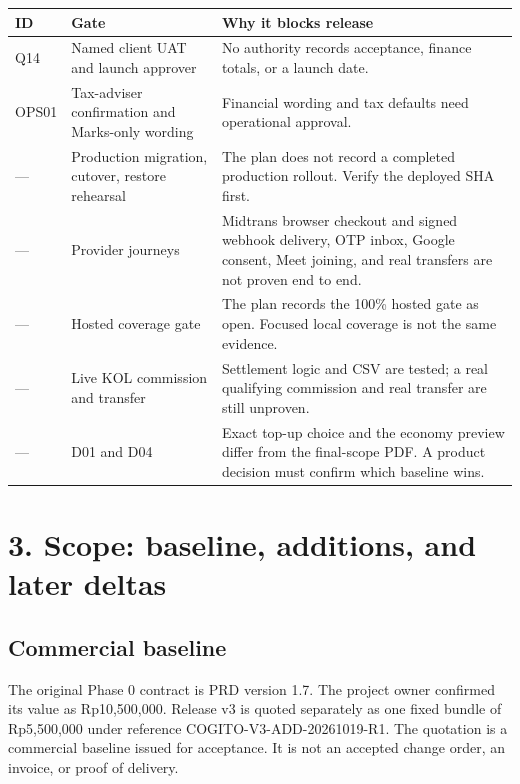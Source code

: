 \documentclass[11pt,a4paper]{article}
\begin{document}
\begin{tabular}{@{}L{1.3cm}L{5.3cm}L{8.3cm}@{}}
\toprule
\textbf{ID} & \textbf{Gate} & \textbf{Why it blocks release} \\
\midrule
Q14 & Named client UAT and launch approver & No authority records acceptance, finance totals, or a launch date. \\
OPS01 & Tax-adviser confirmation and Marks-only wording & Financial wording and tax defaults need operational approval. \\
--- & Production migration, cutover, restore rehearsal & The plan does not record a completed production rollout. Verify the deployed SHA first. \\
--- & Provider journeys & Midtrans browser checkout and signed webhook delivery, OTP inbox, Google consent, Meet joining, and real transfers are not proven end to end. \\
--- & Hosted coverage gate & The plan records the 100\% hosted gate as open. Focused local coverage is not the same evidence. \\
--- & Live KOL commission and transfer & Settlement logic and CSV are tested; a real qualifying commission and real transfer are still unproven. \\
--- & D01 and D04 & Exact top-up choice and the economy preview differ from the final-scope PDF. A product decision must confirm which baseline wins. \\
\bottomrule
\end{tabular}

\section{3. Scope: baseline, additions, and later deltas}

\subsection{Commercial baseline}

The original Phase 0 contract is PRD version 1.7. The project owner confirmed its value as Rp10,500,000. Release v3 is quoted separately as one fixed bundle of Rp5,500,000 under reference COGITO-V3-ADD-20261019-R1. The quotation is a commercial baseline issued for acceptance. It is not an accepted change order, an invoice, or proof of delivery.
\end{document}
